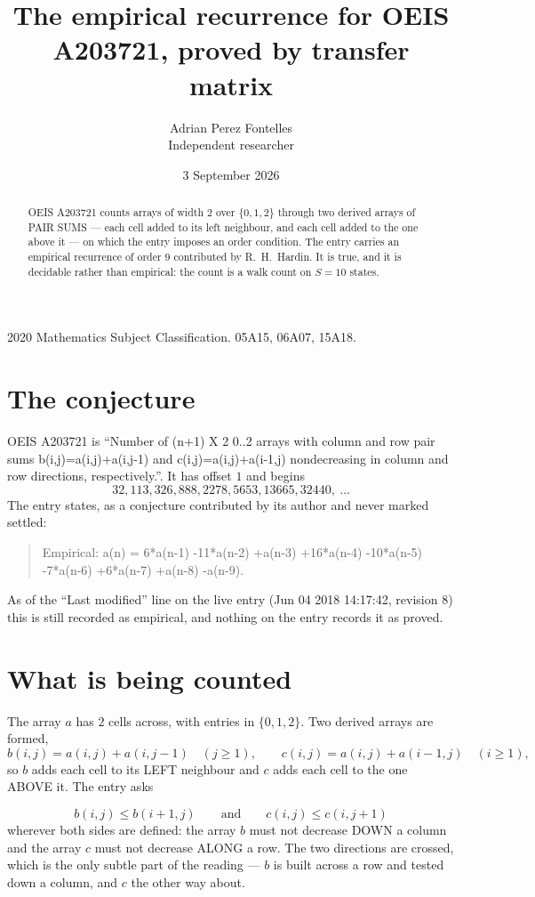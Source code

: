 \documentclass[11pt,a4paper]{article}
\title{The empirical recurrence for OEIS A203721, proved by transfer matrix}
\author{Adrian Perez Fontelles\\ \small Independent researcher}
\date{3 September 2026}
\theoremstyle{plain}
\theoremstyle{definition}
\begin{document}
\maketitle

\begin{abstract}
OEIS A203721 counts arrays of width $2$ over $\{0,1,2\}$ through two derived arrays of PAIR SUMS ---
each cell added to its left neighbour, and each cell added to the one above it --- on which the
entry imposes an order condition. The entry carries an empirical recurrence of order $9$
contributed by R.~H.~Hardin. It is true, and it is decidable rather than empirical: the count is
a walk count on $S=10$ states.
\end{abstract}

\noindent\small 2020 Mathematics Subject Classification. 05A15, 06A07, 15A18.\normalsize

\section{The conjecture}

OEIS A203721 is ``Number of (n+1) X 2 0..2 arrays with column and row pair sums b(i,j)=a(i,j)+a(i,j-1) and c(i,j)=a(i,j)+a(i-1,j) nondecreasing in column and row directions, respectively.''. It has offset $1$ and begins
\[
32, 113, 326, 888, 2278, 5653, 13665, 32440,\ \dots
\]
The entry states, as a conjecture contributed by its author and never marked settled:
\begin{quote}
Empirical: a(n) = 6*a(n-1) -11*a(n-2) +a(n-3) +16*a(n-4) -10*a(n-5) -7*a(n-6) +6*a(n-7) +a(n-8) -a(n-9).
\end{quote}
As of the ``Last modified'' line on the live entry (Jun 04 2018 14:17:42, revision 8) this is still
recorded as empirical, and nothing on the entry records it as proved.

\section{What is being counted}

The array $a$ has $2$ cells across, with entries in $\{0,1,2\}$. Two derived arrays are formed,
\[
b(i,j)=a(i,j)+a(i,j-1)\quad(j\ge1),\qquad c(i,j)=a(i,j)+a(i-1,j)\quad(i\ge1),
\]
so $b$ adds each cell to its LEFT neighbour and $c$ adds each cell to the one ABOVE it. The
entry asks

\[
b(i,j)\le b(i{+}1,j)\qquad\text{and}\qquad c(i,j)\le c(i,j{+}1)
\]
wherever both sides are defined: the array $b$ must not decrease DOWN a column and the array
$c$ must not decrease ALONG a row. The two directions are crossed, which is the only subtle
part of the reading --- $b$ is built across a row and tested down a column, and $c$ the other
way about.
\end{document}
